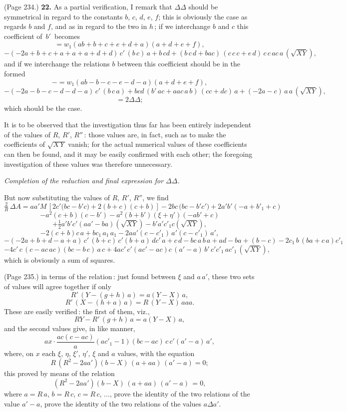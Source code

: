 \documentclass[11pt,a4paper]{article}
\theoremstyle{plain}
\theoremstyle{definition}
\begin{document}
\medskip

\noindent (Page 234.) \textbf{22.} As a partial verification, I remark that $\Delta\Delta$ should be symmetrical in regard to the constants $b$, $c$, $d$, $e$, $f$; this is obviously the case as regards $b$ and $f$, and as in regard to the two in $h$\,; if we interchange $b$ and $c$ this coefficient of $\,b'\,$ becomes
\[
= w_1(a b + b + c + e + d + a)(a + d + e + f),
\]
\[
- (- 2 a + b + c + a + a + a + d + d)\,c'\,(b\,c)\,a + b\,c d + (b\,c\,d + b a c)\,(c\,c\,c + e\,d)\,c\,c\,a c\,a\,(\sqrt{X Y}),
\]
and if we interchange the relations $b$ between this coefficient should be in the formed
\[
- = w_1(a b - b - c - e - d - a)(a + d + e + f),
\]
\[
- (- 2 a - b - c - d - d - a)\,c'\,(b\,c\,a) + b c d\,(b'\,a c + a a c\,a\,b)\,(c c + d c)\,a + (- 2 a - c)\,a\,a\,(\sqrt{X Y}),
\]
\[
= 2\Delta\Delta;
\]
which should be the case.

\medskip

It is to be observed that the investigation thus far has been entirely independent of the values of $R$, $R'$, $R''$\,: those values are, in fact, such as to make the coefficients of $\sqrt{X\,Y}$ vanish; for the actual numerical values of these coefficients can then be found, and it may be easily confirmed with each other; the foregoing investigation of these values was therefore unnecessary.

\medskip

\noindent\textit{Completion of the reduction and final expression for $\Delta\Delta$.}

\medskip

But now substituting the values of $R$, $R'$, $R''$, we find
\[
\tfrac{2}{R}\,\Delta A = a a' M\,[2 c'\big(b c - b' c\big) + 2(b + c)(c + b)] - 2 b c\,(b c - b' c'\big) + 2 a' b'(- a + b'_1 + c)
\]
\[
- a^2(c + b)(c - b') - a^2(b + b')(\xi + \eta')(- a b' + c)
\]
\[
+ \tfrac{1}{2} a' b' c'(a a' - b a)(\sqrt{X Y}) - b' a' c'_1 c (\sqrt{X Y}),
\]
\[
- 2(c + b) c\,a + b c_1\,a_1\,a_1 - 2 a a'(c - c'_1)\,a' (c - c'_1)\,a',
\]
\[
- (-2 a + b + d - a + a)\,c'\,(b + c)\,c' (b + a)\,d c'\,a + c\,d - b c\,a\,b\,a + ad - ba + (b-c) - 2c_1\,b\,(b a + c\,a)c'_1
\]
\[
- 4 c'\,c\,(c - a c\,a c)(b c - b\,c)\,a\,c + 4 a c'\,c' (a c' - a c) c\,(a' - a)\,b'\,c' c'_1\,a c'_1\,(\sqrt{X Y}),
\]
which is obviously a sum of squares.

\medskip

\noindent (Page 235.) in terms of the relation\,: just found between $\xi$ and $a\,a'$, these two sets of values will agree together if only
\[
R'\,(Y - (g + h)\,a) = a (Y - X)\,a,
\]
\[
R'\,(X - (h + a)\,a) = R\,(Y - X)\,a a a.
\]
These are easily verified\,: the first of them, viz.,
\[
R Y - R'\,(g + h)\,a = a (Y - X)\,a,
\]
and the second values give, in like manner,
\[
a x \cdot \frac{a c (c - a c)}{a} (a c'_1 - 1) (b c - a c)\,c\,c' (a' - a)\,a',
\]
where, on $x$ each $\xi$, $\eta$, $\xi'$, $\eta'$, $\xi$ and $a$ values, with the equation
\[
R\,(R^2 - 2 a a')(b - X)\,(a + a a)\,(a' - a) = 0;
\]
this proved by means of the relation
\[
( R^2 - 2 a a')(b - X)\,(a + a a)\,(a' - a)\,= 0,
\]
where $a = R\,a$, $b = R\,c$, $c = R\,c$, $\ldots$, prove the identity of the two relations of the value $a' - a$, prove the identity of the two relations of the values $a\Delta a'$.
\end{document}
